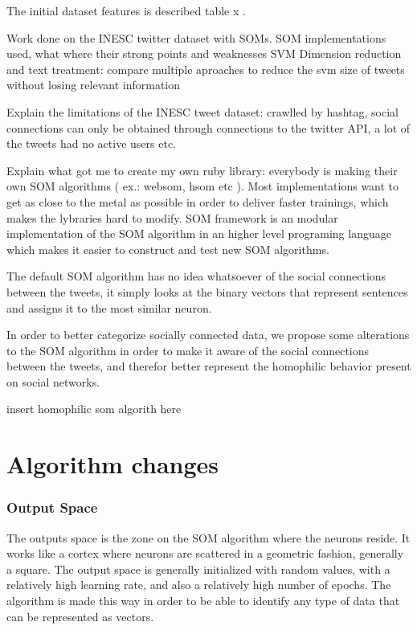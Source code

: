 The initial dataset features is described table x
 .


Work done on the INESC twitter dataset with SOMs.
SOM implementations used, what where their strong points and weaknesses
SVM Dimension reduction and text treatment: compare multiple aproaches to reduce the svm size of tweets without losing relevant information

\label{chap:crawling_twitter}
Explain the limitations of the INESC tweet dataset: crawlled by hashtag, social connections can only be obtained through connections to the twitter API, a lot of the tweets had no active users etc. 

Explain what got me to create my own ruby library: everybody is making their own SOM algorithms ( ex.: websom, hsom etc ). Most implementations want to get as close to the metal as possible in order to deliver faster trainings, which makes the lybraries hard to modify. SOM framework is an modular implementation of the SOM algorithm in an higher level programing language which makes it easier to construct and test new SOM algorithms.

The default \ac{SOM} algorithm has no idea whatsoever of the social connections between the tweets, it simply looks at the binary vectors that represent sentences and assigns it to the most similar neuron.

In order to better categorize socially connected data, we propose some alterations to the \ac{SOM} algorithm in order to make it aware of the social connections between the tweets, and therefor better represent the homophilic behavior present on social networks.

{\color{red} insert homophilic som algorith here}

\chapter{Algorithm changes}
\label{cha:algorithm_changes}

\subsection{Output Space}
\label{sub:output_space}
The outputs space is the zone on the \ac{SOM} algorithm where the neurons reside. It works like a cortex where neurons are scattered in a geometric fashion, generally a square. The output space is generally initialized with random values, with a relatively high learning rate, and also a relatively high number of epochs. The algorithm is made this way in order to be able to identify any type of data that can be represented as vectors.

